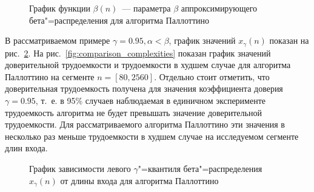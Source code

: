 \documentclass[a4paper, article, 14pt]{extarticle}
\begin{document}
\begin{figure}[h]
	\caption{График функции $\beta(n)$~--- параметра $\beta$ аппроксимирующего бета"=распределения для алгоритма Паллоттино}
	\label{fig:beta_plot}
\end{figure}

В рассматриваемом примере $\gamma = 0.95, \alpha < \beta$, график значений $x_\gamma(n)$ показан на рис.~\ref{fig:left_quantile}. На рис.~\ref{fig:comparison_complexities} показан график значений доверительной трудоемкости и трудоемкости в худшем случае для алгоритма Паллоттино на сегменте $n = [80, 2560]$. Отдельно стоит отметить, что доверительная трудоемкость получена для значения коэффициента доверия $\gamma = 0.95$, т.~е. в 95\% случаев наблюдаемая в единичном эксперименте трудоемкость алгоритма не будет превышать значение доверительной трудоемкости. Для рассматриваемого алгоритма Паллоттино эти значения в несколько раз меньше трудоемкости в худшем случае на исследуемом сегменте длин входа.

\begin{figure}[h]
	\caption{График зависимости левого $\gamma$"=квантиля бета"=распределения $x_\gamma(n)$ от длины входа для алгоритма Паллоттино}
	\label{fig:left_quantile}
\end{figure}
\end{document}
